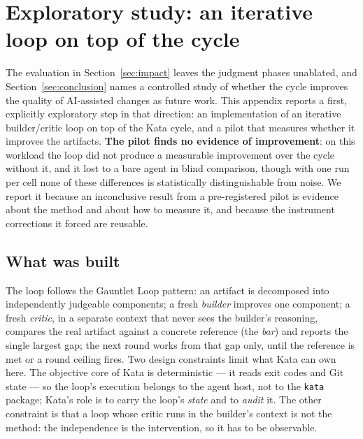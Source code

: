 \documentclass{sbc2019}%
\begin{document}
\appendix

\section{Exploratory study: an iterative loop on top of the cycle}
\label{sec:gauntlet-pilot}

The evaluation in Section~\ref{sec:impact} leaves the judgment phases unablated, and Section~\ref{sec:conclusion}
names a controlled study of whether the cycle improves the quality of
AI-assisted changes as future work. This appendix reports a first, explicitly
exploratory step in that direction: an implementation of an iterative
builder/critic loop on top of the Kata cycle, and a pilot that measures whether
it improves the artifacts. \textbf{The pilot finds no evidence of improvement}: on this
workload the loop did not produce a measurable improvement over the cycle
without it, and it lost to a bare agent in blind comparison, though with one
run per cell none of these differences is statistically distinguishable from
noise. We report it
because an inconclusive result from a pre-registered pilot is evidence about the method
and about how to measure it, and because the instrument corrections it forced
are reusable.

\subsection{What was built}

The loop follows the Gauntlet Loop pattern: an artifact is decomposed into
independently judgeable components; a fresh \emph{builder} improves one
component; a fresh \emph{critic}, in a separate context that never sees the
builder's reasoning, compares the real artifact against a concrete reference
(the \emph{bar}) and reports the single largest gap; the next round works from
that gap only, until the reference is met or a round ceiling fires. Two design
constraints limit what Kata can own here. The objective core of Kata is
deterministic --- it reads exit codes and Git state --- so the loop's execution
belongs to the agent host, not to the \texttt{kata} package; Kata's role is to
carry the loop's \emph{state} and to \emph{audit} it. The other constraint is
that a loop whose
critic runs in the builder's context is not the method: the independence is the
intervention, so it has to be observable.
\end{document}
